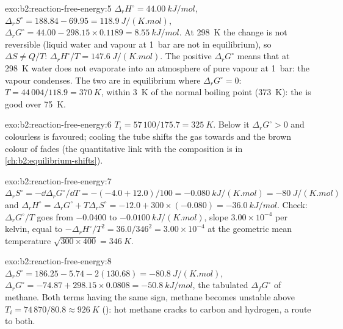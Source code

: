 \begin{solution}{exo:b2:reaction-free-energy:5}
$\Delta_r H^\circ = \qty{44.00}{kJ/mol}$, $\Delta_r S^\circ = 188.84 - 69.95 =
\qty{118.9}{J/(K.mol)}$, $\Delta_r G^\circ = 44.00 - 298.15 \times 0.1189 =
\qty{+8.55}{kJ/mol}$. At \qty{298}{K} the change is not reversible (liquid
water and vapour at \qty{1}{bar} are not in equilibrium), so $\Delta S \ne
Q/T$: $\Delta_r H^\circ/T = \qty{147.6}{J/(K.mol)}$. The positive
$\Delta_r G^\circ$ means that at \qty{298}{K} water does not evaporate into
an atmosphere of pure vapour at \qty{1}{bar}: the vapour condenses. The two
are in equilibrium where $\Delta_r G^\circ = 0$: $T = 44\,004/118.9 =
\qty{370}{K}$, within \qty{3}{K} of the normal boiling point
(\qty{373}{K}): the  is good over \qty{75}{K}.
\end{solution}

\begin{solution}{exo:b2:reaction-free-energy:6}
$T_i = 57\,100/175.7 = \qty{325}{K}$. Below it $\Delta_r G^\circ > 0$ and
colourless  is favoured; cooling the tube shifts the gas towards
 and the brown colour of  fades (the quantitative link with
the composition is in \cref{ch:b2:equilibrium-shifts}).
\end{solution}

\begin{solution}{exo:b2:reaction-free-energy:7}
$\Delta_r S^\circ = -\dd\Delta_r G^\circ/\dd T = -(-4.0 + 12.0)/100 =
\qty{-0.080}{kJ/(K.mol)} = \qty{-80}{J/(K.mol)}$ and $\Delta_r H^\circ =
\Delta_r G^\circ + T\Delta_r S^\circ = -12.0 + 300 \times (-0.080) =
\qty{-36.0}{kJ/mol}$. Check: $\Delta_r G^\circ/T$ goes from $-0.0400$ to
$\qty{-0.0100}{kJ/(K.mol)}$, slope $3.00 \times 10^{-4}$ per kelvin, equal to
$-\Delta_r H^\circ/T^2 = 36.0/346^2 = 3.00 \times 10^{-4}$ at the geometric
mean temperature $\sqrt{300 \times 400} = \qty{346}{K}$.
\end{solution}

\begin{solution}{exo:b2:reaction-free-energy:8}
$\Delta_r S^\circ = 186.25 - 5.74 - 2(130.68) = \qty{-80.8}{J/(K.mol)}$,
$\Delta_r G^\circ = -74.87 + 298.15 \times 0.0808 = \qty{-50.8}{kJ/mol}$,
the tabulated $\Delta_f G^\circ$ of methane. Both terms having the same
sign, methane becomes unstable above $T_i = 74\,870/80.8 \approx
\qty{926}{K}$ (): hot methane cracks to carbon and
hydrogen, a route to both.
\end{solution}

